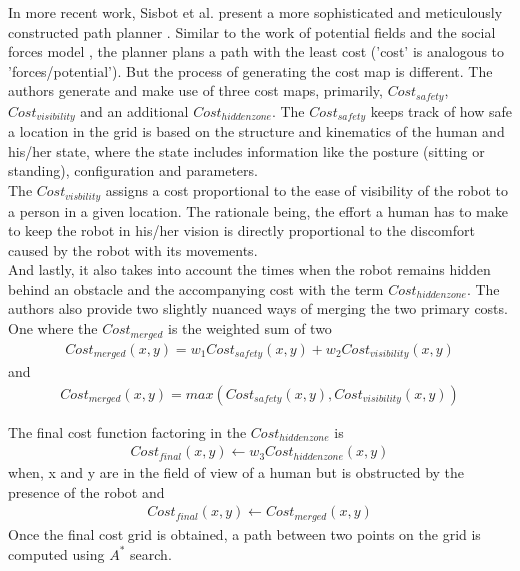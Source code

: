 In more recent work, Sisbot et al. present a more sophisticated and meticulously constructed path planner \cite{sisbot_human_2007}. Similar to the work of potential fields \cite{khatib_1986} and the social forces model \cite{helbing_social_1998}, the planner plans a path with the least cost ('cost' is analogous to 'forces/potential'). But the process of generating the cost map is different.
The authors generate and make use of three cost maps, primarily, $Cost_{safety}$, $Cost_{visibility}$ and an additional $Cost_{hidden zone}$.
The $Cost_{safety}$ keeps track of how safe a location in the grid is based on the structure and kinematics of the human and his/her state, where the state includes information like the posture (sitting or standing), configuration and parameters.\\
The $Cost_{visbility}$ assigns a cost proportional to the ease of visibility of the robot to a person in a given location. The rationale being, the effort a human has to make to keep the robot in his/her vision is directly proportional to the discomfort caused by the robot with its movements.\\
And lastly, it also takes into account the times when the robot remains hidden behind an obstacle and the accompanying cost with the term $Cost_{hidden zone}$. 
The authors also provide two slightly nuanced ways of merging the two primary costs. One where the $Cost_{merged}$ is the weighted sum of two
\begin{align}
Cost_{merged}(x,y) = w_{1}Cost_{safety}(x,y) + w_{2}Cost_{visibility}(x,y)
\end{align}
and 
\begin{align}
Cost_{merged}(x,y) = max(Cost_{safety}(x,y), Cost_{visibility}(x,y))
\end{align}

The final cost function factoring in the $Cost_{hidden zone}$ is
\begin{align}
Cost_{final}(x,y) \leftarrow w_{3} Cost_{hidden zone}(x,y)
\end{align}
when, x and y are in the field of view of a human but is obstructed by the presence of the robot and 
\begin{align}
Cost_{final}(x,y) \leftarrow Cost_{merged}(x,y)
\end{align}
Once the final cost grid is obtained, a path between two points on the grid is computed using $A^*$ search.

